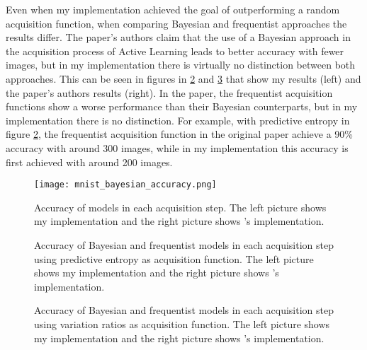 Even when my implementation achieved the goal of outperforming a random acquisition function, when comparing Bayesian and frequentist approaches the results differ. The paper's authors claim that the use of a Bayesian approach in the acquisition process of Active Learning leads to better accuracy with fewer images, but in my implementation there is virtually no distinction between both approaches. This can be seen in figures in \ref{fig:mnist_pred_entropy_AL} and \ref{fig:mnist_var_ratios_AL} that show my results (left) and the paper's authors results (right). In the paper, the frequentist acquisition functions show a worse performance than their Bayesian counterparts, but in my implementation there is no distinction. For example, with predictive entropy in figure \ref{fig:mnist_pred_entropy_AL}, the frequentist acquisition function in the original paper achieve a 90\% accuracy with around 300 images, while in my implementation this accuracy is first achieved with around 200 images.


\begin{figure}[H]
    \centering
    \texttt{[image: mnist\_bayesian\_accuracy.png]}
    \caption{Accuracy of models in each acquisition step. The left picture shows my implementation and the right picture shows \citeauthor{Gal2016Active}'s implementation.}
    \label{fig:mnist_comparison_active_learning_random}
\end{figure}

\begin{figure}[H]
  \centering
  \hfill
  \caption{Accuracy of Bayesian and frequentist models in each acquisition step using predictive entropy as acquisition function. The left picture shows my implementation and the right picture shows \citeauthor{Gal2016Active}'s implementation.}
  \label{fig:mnist_pred_entropy_AL}
\end{figure}


\begin{figure}[H]
  \centering
  \hfill
  \caption{Accuracy of Bayesian and frequentist models in each acquisition step using variation ratios as acquisition function. The left picture shows my implementation and the right picture shows \citeauthor{Gal2016Active}'s implementation.}
  \label{fig:mnist_var_ratios_AL}
\end{figure}


